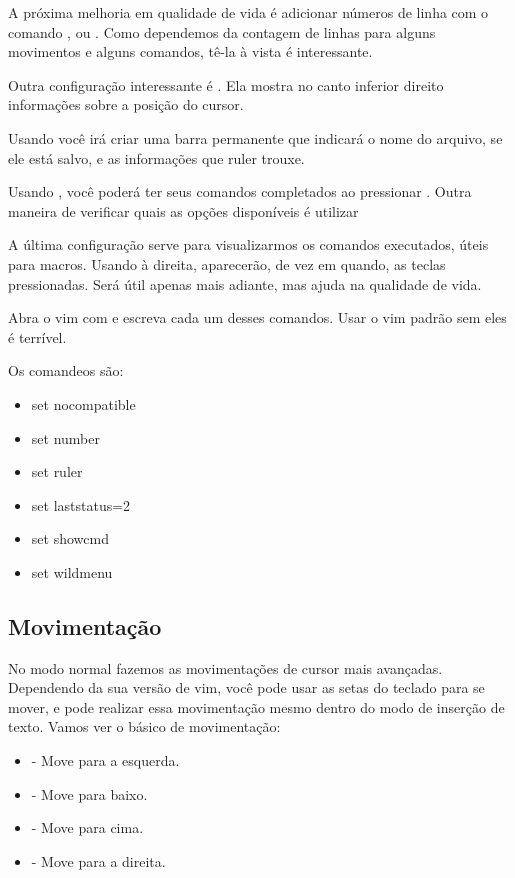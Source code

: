 A próxima melhoria em qualidade de vida é adicionar números de linha com o comando , ou .
Como dependemos da contagem de linhas para alguns movimentos e alguns comandos, tê-la à vista é interessante.

Outra configuração interessante é .
Ela mostra no canto inferior direito informações sobre a posição do cursor.

Usando  você irá criar uma barra permanente que indicará o nome do arquivo,
se ele está salvo, e as informações que ruler trouxe.

Usando , você poderá ter seus comandos completados ao pressionar .
Outra maneira de verificar quais as opções disponíveis é utilizar 

A última configuração serve para visualizarmos os comandos executados, úteis para macros.
Usando  à direita, aparecerão, de vez em quando,
as teclas pressionadas. Será útil apenas mais adiante, mas ajuda na qualidade de vida.

Abra o vim com  e escreva cada um desses comandos.
Usar o vim padrão sem eles é terrível.

Os comandeos são:
\begin{itemize}
    \item set nocompatible
    \item set number
    \item set ruler
    \item set laststatus=2
    \item set showcmd
    \item set wildmenu
\end{itemize}

\subsection{Movimentação}
No modo normal fazemos as movimentações de cursor mais avançadas.
Dependendo da sua versão de vim, você pode usar as setas do teclado para se mover, e pode realizar essa movimentação mesmo dentro do modo de inserção de texto.
Vamos ver o básico de movimentação:
\begin{itemize}
    \item {} - Move para a esquerda.
    \item {} - Move para baixo.
    \item {} - Move para cima.
    \item {} - Move para a direita.
\end{itemize}
